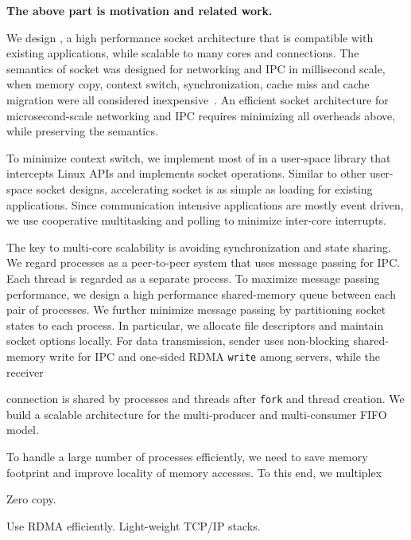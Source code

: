 

\textbf{The above part is motivation and related work.}


We design \sys{}, a high performance socket architecture that is compatible with existing applications, while scalable to many cores and connections. The semantics of socket was designed for networking and IPC in millisecond scale, when memory copy, context switch, synchronization, cache miss and cache migration were all considered inexpensive~\cite{barroso2017attack}. An efficient socket architecture for microsecond-scale networking and IPC requires minimizing all overheads above, while preserving the semantics.

To minimize context switch, we implement most of \sys{} in a user-space library \libipc{} that intercepts Linux APIs and implements socket operations. Similar to other user-space socket designs, accelerating socket is as simple as loading \libipc{} for existing applications. Since communication intensive applications are mostly event driven, we use cooperative multitasking and polling to minimize inter-core interrupts.

The key to multi-core scalability is avoiding synchronization and state sharing. We regard processes as a peer-to-peer system that uses message passing for IPC. Each thread is regarded as a separate process. To maximize message passing performance, we design a high performance shared-memory queue between each pair of processes. We further minimize message passing by partitioning socket states to each process. In particular, we allocate file descriptors and maintain socket options locally. For data transmission, sender uses non-blocking shared-memory write for IPC and one-sided RDMA \texttt{write} among servers, while the receiver 

connection is shared by processes and threads after \texttt{fork} and thread creation. We build a scalable architecture for the multi-producer and multi-consumer FIFO model.

To handle a large number of processes efficiently, we need to save memory footprint and improve locality of memory accesses. To this end, we multiplex

Zero copy.

Use RDMA efficiently. Light-weight TCP/IP stacks.
